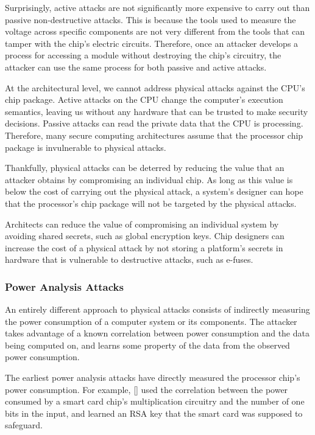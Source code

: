 Surprisingly, active attacks are not significantly more expensive to carry out
than passive non-destructive attacks. This is because the tools used to measure
the voltage across specific components are not very different from the tools
that can tamper with the chip's electric circuits. Therefore, once an attacker
develops a process for accessing a module without destroying the chip's
circuitry, the attacker can use the same process for both passive and active
attacks.

At the architectural level, we cannot address physical attacks against the
CPU's chip package. Active attacks on the CPU change the computer's execution
semantics, leaving us without any hardware that can be trusted to make security
decisions. Passive attacks can read the private data that the CPU is
processing. Therefore, many secure computing architectures assume that the
processor chip package is invulnerable to physical attacks.

Thankfully, physical attacks can be deterred by reducing the value that an
attacker obtains by compromising an individual chip. As long as this value is
below the cost of carrying out the physical attack, a system's designer can
hope that the processor's chip package will not be targeted by the physical
attacks.

Architects can reduce the value of compromising an individual system by
avoiding shared secrets, such as global encryption keys. Chip designers can
increase the cost of a physical attack by not storing a platform's secrets in
hardware that is vulnerable to destructive attacks, such as e-fuses.


\subsubsection{Power Analysis Attacks}
\label{sec:power_analysis_attacks}

An entirely different approach to physical attacks consists of indirectly
measuring the power consumption of a computer system or its components. The
attacker takes advantage of a known correlation between power consumption and
the data being computed on, and learns some property of the data from the
observed power consumption.

The earliest power analysis attacks have directly measured the processor chip's
power consumption. For example, [] used the correlation between the power
consumed by a smart card chip's multiplication circuitry and the number of one
bits in the input, and learned an RSA key that the smart card was supposed to
safeguard.

